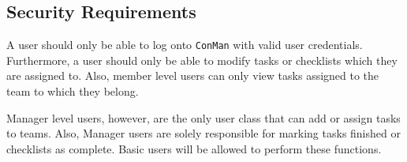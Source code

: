 \documentclass{article}
\begin{document}
\subsection{Security Requirements}
A user should only be able to log onto \texttt{ConMan} with valid user credentials.
Furthermore, a user should only be able to modify tasks or checklists which they are assigned to.
Also, member level users can only view tasks assigned to the team to which they belong.

Manager level users, however, are the only user class that can add or assign tasks to teams.  Also, Manager users are solely responsible for marking tasks finished  or checklists as complete.  Basic users will be allowed to perform these functions.
\end{document}
